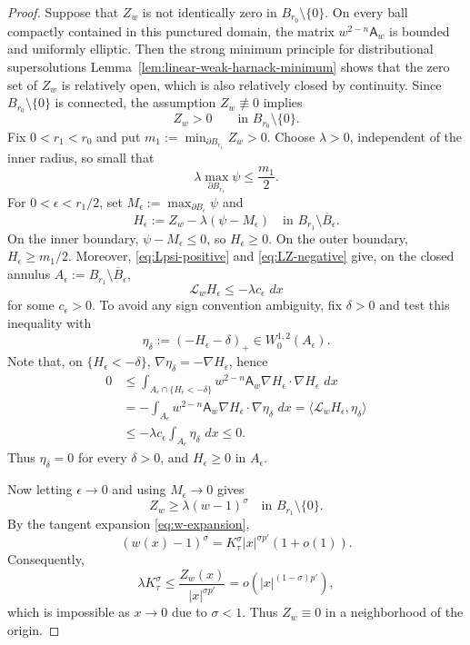 \documentclass[reqno,12pt]{amsart}
\numberwithin{equation}{section}
\theoremstyle{remark}
\newcommand{\dd}{\,d}
\newcommand{\Lscr}{\mathscr L}
\begin{document}
\begin{proof}
Suppose that $Z_w$ is not identically zero in
$B_{r_0}\setminus\{0\}$.  On every ball compactly contained in
this punctured domain, the matrix
$w^{2-n}\mathsf A_w$ is bounded and uniformly elliptic.
Then the strong minimum principle for distributional supersolutions Lemma~\ref{lem:linear-weak-harnack-minimum}
shows that the zero set of $Z_w$ is relatively open, which is also relatively closed by continuity.
Since $B_{r_0}\setminus\{0\}$ is connected, the assumption
$Z_w\not\equiv 0$ implies
$$
Z_w>0 \qquad\text{in }B_{r_0}\setminus\{0\}.
$$
Fix $0<r_1<r_0$ and put
$m_1:=\min_{\partial B_{r_1}}Z_w>0$.  Choose $\lambda>0$, independent of the inner radius, so small that
$$
\lambda\max_{\partial B_{r_1}}\psi\le\frac{m_1}{2}.
$$
For $0<\epsilon<r_1/2$, set
$M_\epsilon:=\max_{\partial B_\epsilon}\psi$ and
$$
H_\epsilon:= Z_w-\lambda(\psi-M_\epsilon)
\quad\text{in }B_{r_1}\setminus\overline{B}_\epsilon.
$$
On the inner boundary, $\psi-M_\epsilon\le0$, so
$H_\epsilon\ge0$.  On the outer boundary,
$H_\epsilon\ge m_1/2$.  Moreover,
\eqref{eq:Lpsi-positive} and \eqref{eq:LZ-negative} give, on the closed annulus
$A_\epsilon:=B_{r_1}\setminus\overline B_\epsilon$,
$$
\Lscr_wH_\epsilon\le -\lambda c_\epsilon\,\dd x
$$
for some $c_\epsilon>0$.  To avoid any sign convention ambiguity, fix
$\delta>0$ and test this inequality with
$$
\eta_\delta:=(-H_\epsilon-\delta)_+\in W^{1,2}_0(A_\epsilon).
$$
Note that, on $\{H_\epsilon<-\delta\}$, $\nabla\eta_\delta=-\nabla H_\epsilon$, hence
\begin{align*}
0&\le  \int_{A_\epsilon\cap\{H_\epsilon<-\delta\}}
 w^{2-n}\mathsf A_w\nabla H_\epsilon\cdot\nabla H_\epsilon\,\dd x\\
&= -\int_{A_\epsilon} w^{2-n}\mathsf A_w\nabla H_\epsilon\cdot\nabla\eta_\delta\,\dd x
 = \langle \Lscr_wH_\epsilon,\eta_\delta\rangle\\
&\le -\lambda c_\epsilon\int_{A_\epsilon}\eta_\delta\,\dd x\le 0.
\end{align*}
Thus $\eta_\delta=0$ for every $\delta>0$, and $H_\epsilon\ge0$ in $A_\epsilon$. 

Now letting
$\epsilon\to 0$ and using $M_\epsilon\to0$ gives
$$
Z_w\ge\lambda(w-1)^\sigma
\quad\text{in }B_{r_1}\setminus\{0\}.
$$
By the tangent expansion \eqref{eq:w-expansion},
$$
    (w(x)-1)^\sigma  = K_\tau^\sigma|x|^{\sigma p'}(1+o(1)).
$$
Consequently,
$$
  \lambda K_\tau^\sigma \le \frac{Z_w(x)}{|x|^{\sigma p'}} 
  =  o\!\left(|x|^{(1-\sigma)p'}\right),
$$
which is impossible as $x\to 0$ due to $\sigma<1$.
Thus $Z_w\equiv 0$ in a neighborhood of the origin.
\end{proof}
\end{document}

